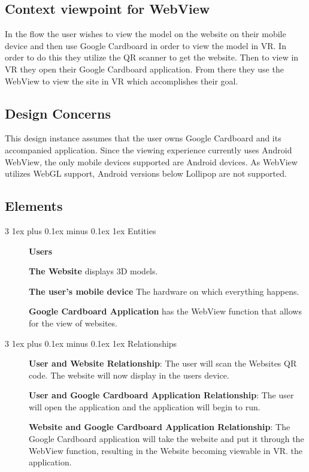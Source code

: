 \documentclass[letterpaper, 10pt, draftclsnofoot, compsoc, onecolumn]{IEEEtran}
\makeatletter
\def\subsubsection{\@startsection{subsubsection}%
                                 {3}%
                                 {\z@}%
                                 {1ex plus 0.1ex minus 0.1ex}%
                                 {1ex}%
                                 {\normalfont\normalsize}}%
\makeatother
\begin{document}
\subsection{Context viewpoint for WebView}
	In the flow the user wishes to view the model on the website on their mobile device and then use Google Cardboard in order to view the model in VR. In order to do this they utilize the QR scanner to get the website. Then to view in VR they open their Google Cardboard application. From there they use the WebView to view the site in VR which accomplishes their goal.
\subsection{Design Concerns}
	This design instance assumes that the user owns Google Cardboard and its accompanied application. Since the viewing experience currently uses Android WebView, the only mobile devices supported are Android devices. As WebView utilizes WebGL support, Android versions below Lollipop are not supported.
\subsection{Elements}
\subsubsection{Entities}
\begin{description}
	\item[]\textbf{Users}
	\item[]\textbf{The Website} displays 3D models.
	\item[]\textbf{The user's mobile device} The hardware on which everything happens.
	\item[]\textbf{Google Cardboard Application} has the WebView function that allows for the view of websites.
\end{description}
\subsubsection{Relationships}
\begin{description}
	\item[]\textbf{User and Website Relationship}: The user will scan the Websites QR code. The website will now display in the users device.
	\item[]\textbf{User and Google Cardboard Application Relationship}: The user will open the application and the application will begin to run.
	\item[]\textbf{Website and Google Cardboard Application Relationship}: The Google Cardboard application will take the website and put it through the WebView function, resulting in the Website becoming viewable in VR.
the application.
\end{description}
\end{document}
